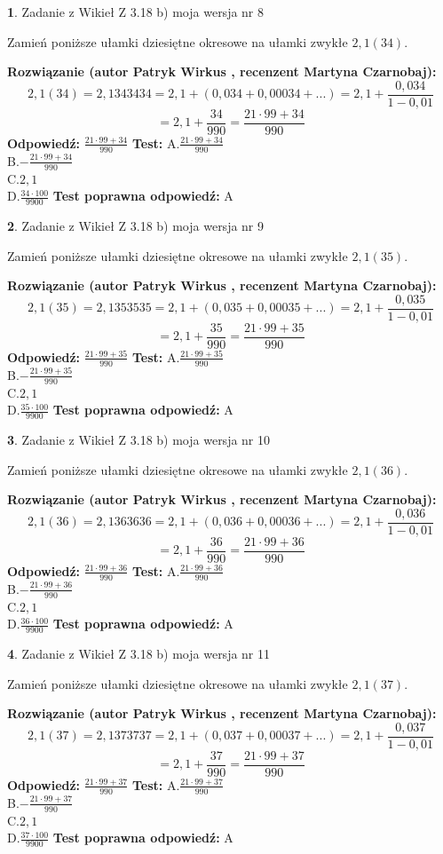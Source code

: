 \documentclass[12pt, a4paper]{article}
\theoremstyle{definition} %
\newtheorem{zad}{}
\newcommand{\zadStart}[1]{\begin{zad}#1\newline}
\newcommand{\zadStop}{\end{zad}}
\newcommand{\rozwStart}[2]{\noindent \textbf{Rozwiązanie (autor #1 , recenzent #2): }\newline}
\newcommand{\rozwStop}{\newline}
\newcommand{\odpStart}{\noindent \textbf{Odpowiedź:}\newline}
\newcommand{\odpStop}{\newline}
\newcommand{\testStart}{\noindent \textbf{Test:}\newline}
\newcommand{\testStop}{\newline}
\newcommand{\kluczStart}{\noindent \textbf{Test poprawna odpowiedź:}\newline}
\newcommand{\kluczStop}{\newline}
\begin{document}
\zadStart{Zadanie z Wikieł Z 3.18 b) moja wersja nr 8}

Zamień poniższe ułamki dziesiętne okresowe na ułamki zwykłe $2,1(34)$.
\zadStop
\rozwStart{Patryk Wirkus}{Martyna Czarnobaj}
$$2,1(34)=2,1343434=2,1+(0,034+0,00034+...)=2,1+\frac{0,034}{1-0,01}$$
$$=2,1+\frac{34}{990}=\frac{21\cdot99+34}{990}$$
\rozwStop
\odpStart
$\frac{21\cdot99+34}{990}$
\odpStop
\testStart
A.$\frac{21\cdot99+34}{990}$\\ B.$-\frac{21\cdot99+34}{990}$\\ C.$2,1$\\ D.$\frac{34\cdot100}{9900}$
\testStop
\kluczStart
A
\kluczStop



\zadStart{Zadanie z Wikieł Z 3.18 b) moja wersja nr 9}

Zamień poniższe ułamki dziesiętne okresowe na ułamki zwykłe $2,1(35)$.
\zadStop
\rozwStart{Patryk Wirkus}{Martyna Czarnobaj}
$$2,1(35)=2,1353535=2,1+(0,035+0,00035+...)=2,1+\frac{0,035}{1-0,01}$$
$$=2,1+\frac{35}{990}=\frac{21\cdot99+35}{990}$$
\rozwStop
\odpStart
$\frac{21\cdot99+35}{990}$
\odpStop
\testStart
A.$\frac{21\cdot99+35}{990}$\\ B.$-\frac{21\cdot99+35}{990}$\\ C.$2,1$\\ D.$\frac{35\cdot100}{9900}$
\testStop
\kluczStart
A
\kluczStop



\zadStart{Zadanie z Wikieł Z 3.18 b) moja wersja nr 10}

Zamień poniższe ułamki dziesiętne okresowe na ułamki zwykłe $2,1(36)$.
\zadStop
\rozwStart{Patryk Wirkus}{Martyna Czarnobaj}
$$2,1(36)=2,1363636=2,1+(0,036+0,00036+...)=2,1+\frac{0,036}{1-0,01}$$
$$=2,1+\frac{36}{990}=\frac{21\cdot99+36}{990}$$
\rozwStop
\odpStart
$\frac{21\cdot99+36}{990}$
\odpStop
\testStart
A.$\frac{21\cdot99+36}{990}$\\ B.$-\frac{21\cdot99+36}{990}$\\ C.$2,1$\\ D.$\frac{36\cdot100}{9900}$
\testStop
\kluczStart
A
\kluczStop



\zadStart{Zadanie z Wikieł Z 3.18 b) moja wersja nr 11}

Zamień poniższe ułamki dziesiętne okresowe na ułamki zwykłe $2,1(37)$.
\zadStop
\rozwStart{Patryk Wirkus}{Martyna Czarnobaj}
$$2,1(37)=2,1373737=2,1+(0,037+0,00037+...)=2,1+\frac{0,037}{1-0,01}$$
$$=2,1+\frac{37}{990}=\frac{21\cdot99+37}{990}$$
\rozwStop
\odpStart
$\frac{21\cdot99+37}{990}$
\odpStop
\testStart
A.$\frac{21\cdot99+37}{990}$\\ B.$-\frac{21\cdot99+37}{990}$\\ C.$2,1$\\ D.$\frac{37\cdot100}{9900}$
\testStop
\kluczStart
A
\kluczStop
\end{document}
